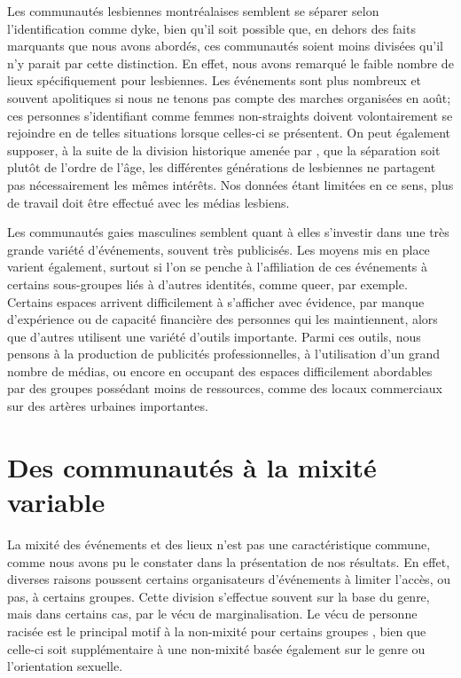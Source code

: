 Les communautés lesbiennes montréalaises semblent se séparer selon l'identification comme dyke, bien qu'il soit possible que, en dehors des faits marquants que nous avons abordés, ces communautés soient moins divisées qu'il n'y parait par cette distinction.
En effet, nous avons remarqué le faible nombre de lieux spécifiquement pour lesbiennes.
Les événements sont plus nombreux et souvent apolitiques si nous ne tenons pas compte des marches organisées en août; ces personnes s'identifiant comme femmes non-straights doivent volontairement se rejoindre en de telles situations lorsque celles-ci se présentent.
On peut également supposer, à la suite de la division historique amenée par \citet{Giraud2014}, que la séparation soit plutôt de l'ordre de l'âge, les différentes générations de lesbiennes ne partagent pas nécessairement les mêmes intérêts.
Nos données étant limitées en ce sens, plus de travail doit être effectué avec les médias lesbiens.

Les communautés gaies masculines semblent quant à elles s'investir dans une très grande variété d'événements, souvent très publicisés. 
Les moyens mis en place varient également, surtout si l'on se penche à l'affiliation de ces événements à certains sous-groupes liés à d'autres identités, comme queer, par exemple.
Certains espaces arrivent difficilement à s'afficher avec évidence, par manque d'expérience ou de capacité financière des personnes qui les maintiennent, alors que d'autres utilisent une variété d'outils importante. 
Parmi ces outils, nous pensons à la production de publicités professionnelles, à l'utilisation d'un grand nombre de médias, ou encore en occupant des espaces difficilement abordables par des groupes possédant moins de ressources, comme des locaux commerciaux sur des artères urbaines importantes.

\section{Des communautés à la mixité variable}
La mixité des événements et des lieux \lgbt{} n'est pas une caractéristique commune, comme nous avons pu le constater dans la présentation de nos résultats.
En effet, diverses raisons poussent certains organisateurs d'événements à limiter l'accès, ou pas, à certains groupes.
Cette division s'effectue souvent sur la base du genre, mais dans certains cas, par le vécu de marginalisation.
Le vécu de personne racisée est le principal motif à la non-mixité pour certains groupes \lgbt{}, bien que celle-ci soit supplémentaire à une non-mixité basée également sur le genre ou l'orientation sexuelle.

